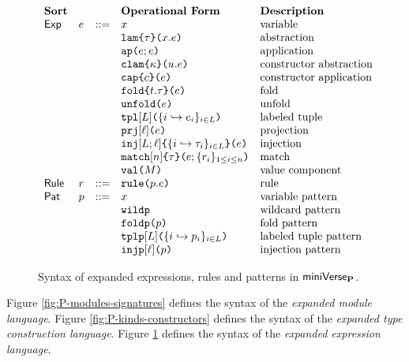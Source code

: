 \begin{figure}
\[\begin{array}{lllllll}
\textbf{Sort} & & & \textbf{Operational Form} 
& \textbf{Description}\\
\mathsf{Exp} & e & ::= & x 
& \text{variable}\\
&&& \aelam{\tau}{x}{e} 
& \text{abstraction}\\
&&& \aeap{e}{e} 
& \text{application}\\
&&& \aeclam{\kappa}{u}{e} %
& \text{constructor abstraction}\\
&&& \aecap{e}{c} %
& \text{constructor application}\\
&&& \aefold{t}{\tau}{e} %
& \text{fold}\\
&&& \aeunfold{e} %
& \text{unfold}\\
&&& \aetpl{\labelset}{\mapschema{e}{i}{\labelset}} 
& \text{labeled tuple}\\
&&& \aepr{\ell}{e} 
& \text{projection}\\
&&& \aein{\labelset}{\ell}{\mapschema{\tau}{i}{\labelset}}{e} 
& \text{injection}\\
&&& \aematchwith{n}{\tau}{e}{\seqschemaX{r}} 
& \text{match}\\
&&& \amval{M} 
& \text{value component}\\
\mathsf{Rule} & r & ::= & \aematchrule{p}{e} 
& \text{rule}\\
\mathsf{Pat} & p & ::= & x 
& \text{variable pattern}\\
&&& \aewildp 
& \text{wildcard pattern}\\
&&& \aefoldp{p} 
& \text{fold pattern}\\
&&& \aetplp{\labelset}{\mapschema{p}{i}{\labelset}} 
& \text{labeled tuple pattern}\\
&&& \aeinjp{\ell}{p} 
& \text{injection pattern}
\end{array}\]
\caption[Syntax of expanded expressions, rules and patterns in $\miniVerseParam$]{Syntax of expanded expressions, rules and patterns in $\miniVerseParam$.}
\label{fig:P-expanded-terms}
\end{figure}


Figure \ref{fig:P-modules-signatures} defines the syntax of the \emph{expanded module language}. Figure \ref{fig:P-kinds-constructors} defines the syntax of the \emph{expanded type construction language}. Figure \ref{fig:P-expanded-terms} defines the syntax of the \emph{expanded expression language}.


